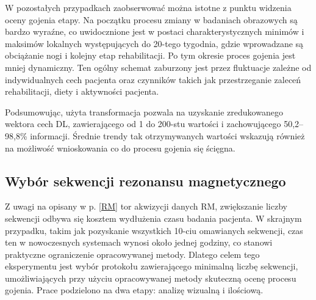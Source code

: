 W pozostałych przypadkach zaobserwować można istotne z punktu widzenia oceny gojenia etapy. Na początku procesu zmiany w badaniach obrazowych są bardzo wyraźne, co uwidocznione jest w postaci charakterystycznych minimów i maksimów lokalnych występujących do 20-tego tygodnia, gdzie wprowadzane są obciążanie nogi i kolejny etap rehabilitacji. Po tym okresie proces gojenia jest mniej dynamiczny. Ten ogólny schemat zaburzony jest przez fluktuacje zależne od indywidualnych cech pacjenta oraz czynników takich jak przestrzeganie zaleceń rehabilitacji, diety i aktywności pacjenta. 

Podsumowując, użyta transformacja pozwala na uzyskanie zredukowanego wektora cech DL, zawierającego od 1 do 200-stu wartości i zachowującego 50,2--98,8\% informacji. Średnie trendy tak otrzymywanych wartości wskazują również na możliwość wnioskowania co do procesu gojenia się ścięgna.  


\subsection{Wybór sekwencji rezonansu magnetycznego}
\label{seq:protocol_selection}
Z uwagi na opisany w p. \ref{RM} tor akwizycji danych RM, zwiększanie liczby sekwencji odbywa się kosztem wydłużenia czasu badania pacjenta. W skrajnym przypadku, takim jak pozyskanie wszystkich 10-ciu omawianych sekwencji, czas ten w nowoczesnych systemach wynosi około jednej godziny, co stanowi praktyczne ograniczenie opracowywanej metody. Dlatego celem tego eksperymentu jest wybór protokołu zawierającego minimalną liczbę sekwencji, umożliwiających przy użyciu opracowywanej metody skuteczną ocenę procesu gojenia. Prace podzielono na dwa etapy: analizę wizualną i ilościową.


